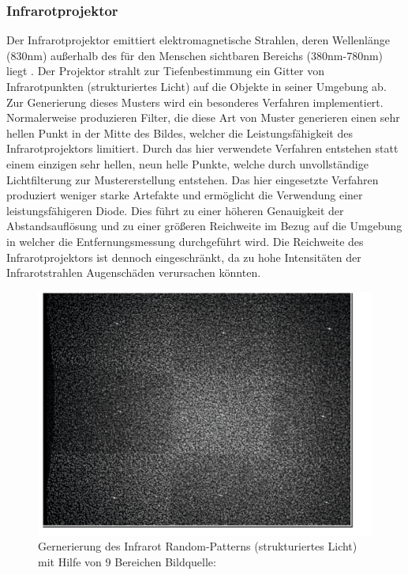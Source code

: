 \subsubsection{Infrarotprojektor}
Der Infrarotprojektor emittiert elektromagnetische Strahlen, deren Wellenlänge (830nm) außerhalb des für den Menschen sichtbaren Bereichs (380nm-780nm) liegt \cite{borenstein2012making}.
Der Projektor strahlt zur Tiefenbestimmung ein Gitter von Infrarotpunkten (strukturiertes Licht) auf die Objekte in seiner Umgebung ab. 
Zur Generierung dieses Musters wird ein besonderes Verfahren implementiert.
Normalerweise produzieren Filter, die diese Art von Muster generieren einen sehr hellen Punkt in der Mitte des Bildes, welcher die Leistungsfähigkeit des Infrarotprojektors limitiert. Durch das hier verwendete Verfahren entstehen statt einem einzigen sehr hellen, neun helle Punkte, welche durch unvollständige Lichtfilterung zur Mustererstellung entstehen\cite{Kramer}. Das hier eingesetzte Verfahren produziert weniger starke Artefakte und ermöglicht die Verwendung einer leistungsfähigeren Diode. Dies führt zu einer höheren Genauigkeit der Abstandsauflösung und zu einer größeren Reichweite im Bezug auf die Umgebung in welcher die Entfernungsmessung durchgeführt wird. Die Reichweite des Infrarotprojektors ist dennoch eingeschränkt, da zu hohe Intensitäten der Infrarotstrahlen Augenschäden verursachen könnten.
\begin{figure}
\centering
\includegraphics[width=0.5\linewidth]{./Res/9_Dots}
\caption{Gernerierung des Infrarot Random-Patterns (strukturiertes Licht) mit Hilfe von 9 Bereichen Bildquelle:\cite{Kramer}}
\label{fig:9_Dots}
\end{figure}
\FloatBarrier

